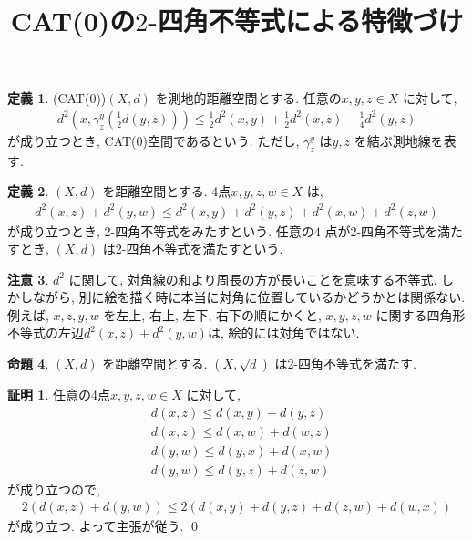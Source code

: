 \documentclass[10pt, fleqn, label-section=none]{bxjsarticle}
\title{CAT(0)の$2$-四角不等式による特徴づけ}
\date{}
\author{}
\theoremstyle{definition}
\newtheorem{dfn}{定義}[section]
\newtheorem{prop}[dfn]{命題}
\newtheorem*{pf*}{証明}
\newtheorem{remark}[dfn]{注意}
\renewcommand{\;}{\, ; \,}
\begin{document}
\maketitle

\section{}

\begin{dfn}(CAT(0))$(X, d)$ を測地的距離空間とする. 任意の$x, y, z \in X$ に対して, 
\begin{align*} d^2(x, \gamma_z^y(\frac{1}{2}d(y,z))  ) \leq \frac{1}{2} d^2(x, y) +  \frac{1}{2} d^2(x, z) -  \frac{1}{4} d^2(y, z) \end{align*}
が成り立つとき, CAT(0)空間であるという. ただし, $\gamma_z^y $ は$y, z$ を結ぶ測地線を表す. 
\end{dfn}

\begin{dfn}$(X, d)$ を距離空間とする. 
4点$x, y, z, w \in X$ は, 
\begin{align*} d^2(x, z)+ d^2(y, w) \leq d^2(x, y) + d^2(y, z) + d^2(x, w) + d^2(z, w) \end{align*} 
が成り立つとき, $2$-四角不等式をみたすという. 任意の$4$ 点が2-四角不等式を満たすとき, $(X, d)$ は2-四角不等式を満たすという. 
\end{dfn}

\begin{remark}$d^2$ に関して, 対角線の和より周長の方が長いことを意味する不等式. しかしながら, 別に絵を描く時に本当に対角に位置しているかどうかとは関係ない. 例えば, $x, z, y, w$ を左上, 右上, 左下, 右下の順にかくと, $x, y, z, w$ に関する四角形不等式の左辺$d^2(x, z)+ d^2(y, w) $は, 絵的には対角ではない. 

\end{remark}


\begin{prop}$(X, d)$ を距離空間とする. $(X, \sqrt d)$ は2-四角不等式を満たす. 

\end{prop}
\begin{pf*}任意の4点$x, y, z, w \in X$ に対して, 
\begin{align*} &d(x, z) \leq d(x, y) + d(y, z) \\&d(x, z) \leq d(x, w) + d(w, z) \\& d(y, w) \leq d(y, x) + d(x, w) \\& d(y, w) \leq d(y, z) + d(z, w) \end{align*}
が成り立つので, 
\begin{align*} 2(d(x,z) + d(y, w) ) \leq 2 (d(x, y) + d(y ,  z) + d(z, w) + d(w, x))\end{align*}
が成り立つ. よって主張が従う. 
\qed
\end{pf*}
\end{document}
